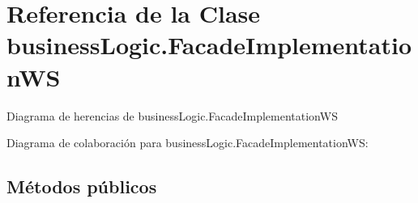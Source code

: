 \hypertarget{classbusiness_logic_1_1_facade_implementation_w_s}{}\section{Referencia de la Clase business\+Logic.\+Facade\+Implementation\+WS}
\label{classbusiness_logic_1_1_facade_implementation_w_s}


Diagrama de herencias de business\+Logic.\+Facade\+Implementation\+WS


Diagrama de colaboración para business\+Logic.\+Facade\+Implementation\+WS\+:
\subsection*{Métodos públicos}
